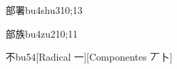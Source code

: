 \begin{verbete}{部署}{bu4shu3}{10;13}
\end{verbete}

\begin{verbete}{部族}{bu4zu2}{10;11}
\end{verbete}

\begin{verbete}{不}{bu5}{4}[Radical 一][Componentes 丆卜]
\end{verbete}

